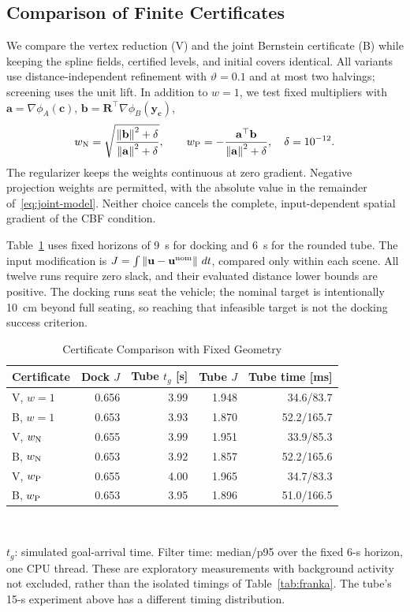 \documentclass[journal]{IEEEtran}
\theoremstyle{definition}
\newcommand{\norm}[1]{\left\lVert #1\right\rVert}
\newcommand{\Rot}{\mathbf{R}}
\begin{document}
\subsection{Comparison of Finite Certificates}\label{sec:cert-comparison}
We compare the vertex reduction (V) and the joint Bernstein certificate (B) while keeping
the spline fields, certified levels, and initial covers identical. All variants use
distance-independent refinement with $\vartheta=0.1$ and at most two halvings; screening
uses the unit lift. In addition to $w=1$, we test fixed multipliers with
$\mathbf a=\nabla\phi_A(\mathbf c)$, $\mathbf b=\Rot^\top\nabla\phi_B(\mathbf y_{\mathbf c})$,
\begin{equation}
w_{\rm N}=\sqrt{\frac{\norm{\mathbf b}^2+\delta}{\norm{\mathbf a}^2+\delta}},\qquad
w_{\rm P}=-\frac{\mathbf a^\top\mathbf b}{\norm{\mathbf a}^2+\delta},\quad\delta=10^{-12}.
\end{equation}
The regularizer keeps the weights continuous at zero gradient. Negative projection weights
are permitted, with the absolute value in the remainder of~\eqref{eq:joint-model}.
Neither choice cancels the complete, input-dependent spatial gradient of the CBF condition.

Table~\ref{tab:cert-comparison} uses fixed horizons of 9~s for docking and 6~s for the rounded
tube. The input modification is $J=\int\norm{\mathbf u-\mathbf u^{\rm nom}}\,dt$, compared
only within each scene. All twelve runs require zero slack, and their evaluated distance
lower bounds are positive. The docking runs seat the vehicle; the nominal target is intentionally
10~cm beyond full seating, so reaching that infeasible target is not the docking success criterion.

\begin{table}[t]
\caption{Certificate Comparison with Fixed Geometry}
\label{tab:cert-comparison}
\centering\footnotesize
\setlength{\tabcolsep}{3pt}
\begin{tabular}{lrrrr}
\toprule
Certificate & Dock $J$ & Tube $t_g$ [s] & Tube $J$ & Tube time [ms]\\
\midrule
V, $w=1$       & 0.656 & 3.99 & 1.948 & 34.6/83.7\\
B, $w=1$       & 0.653 & 3.93 & 1.870 & 52.2/165.7\\
V, $w_{\rm N}$ & 0.655 & 3.99 & 1.951 & 33.9/85.3\\
B, $w_{\rm N}$ & 0.653 & 3.92 & 1.857 & 52.2/165.6\\
V, $w_{\rm P}$ & 0.655 & 4.00 & 1.965 & 34.7/83.3\\
B, $w_{\rm P}$ & 0.653 & 3.95 & 1.896 & 51.0/166.5\\
\bottomrule
\end{tabular}
\\[3pt]
\parbox{\columnwidth}{\footnotesize $t_g$: simulated goal-arrival time. Filter time: median/p95
over the fixed 6-s horizon, one CPU thread. These are exploratory measurements with background
activity not excluded, rather than the isolated timings of Table~\ref{tab:franka}. The tube's
15-s experiment above has a different timing distribution.}
\end{table}
\end{document}
